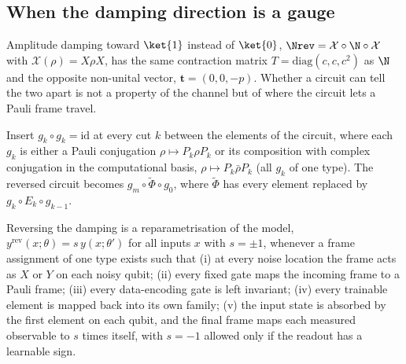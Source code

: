 %

\subsection{When the damping direction is a gauge}
\label{sec:gauge}

Amplitude damping toward $\ket{1}$ instead of $\ket{0}$,
$\Nrev=\mathcal X\circ\N\circ\mathcal X$ with $\mathcal X(\rho)=X\rho X$, has the same
contraction matrix $T=\mathrm{diag}(c,c,c^2)$ as $\N$ and the opposite non-unital vector,
$\mathbf t=(0,0,-p)$. Whether a circuit can tell the two apart is not a property of the
channel but of where the circuit lets a Pauli frame travel.

Insert $g_k\circ g_k=\mathrm{id}$ at every cut $k$ between the elements of the circuit,
where each $g_k$ is either a Pauli conjugation $\rho\mapsto P_k\rho P_k$ or its composition
with complex conjugation in the computational basis, $\rho\mapsto P_k\bar\rho P_k$ (all $g_k$
of one type). The reversed circuit becomes $g_m\circ\tilde\Phi\circ g_0$, where $\tilde\Phi$
has every element replaced by $g_k\circ E_k\circ g_{k-1}$.

\begin{proposition}\label{prop:gauge}
Reversing the damping is a reparametrisation of the model, $y^{\mathrm{rev}}(x;\theta)=s\,y(x;\theta')$
for all inputs $x$ with $s=\pm1$, whenever a frame assignment of one type exists such that
(i) at every noise location the frame acts as $X$ or $Y$ on each noisy qubit;
(ii) every fixed gate maps the incoming frame to a Pauli frame;
(iii) every data-encoding gate is left invariant;
(iv) every trainable element is mapped back into its own family;
(v) the input state is absorbed by the first element on each qubit, and the final frame
maps each measured observable to $s$ times itself, with $s=-1$ allowed only if the readout
has a learnable sign.
\end{proposition}

